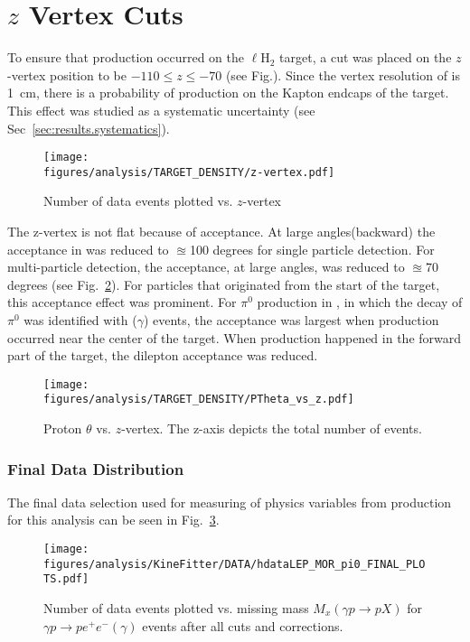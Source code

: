 \FloatBarrier
\section{$z$ Vertex Cuts}\label{sec:analysis.zvert}
To ensure that \piz production occurred on the $\ell$H$_2$ target, a cut was placed on the $z$-vertex position to be $-110 \le z \le -70$ (see Fig.). Since the vertex resolution of  is 1~cm, there is a probability of \piz production on the Kapton endcaps of the target. This effect was studied as a systematic uncertainty (see Sec~\ref{sec:results.systematics}). 
\begin{figure}[h!]\begin{center}
\texttt{[image: \\figures/analysis/TARGET\_DENSITY/z-vertex.pdf]}
\caption[Number of data events plotted vs. $z$-vertex]{\label{fig:zcut}Number of data events plotted vs. $z$-vertex}
\end{center}\end{figure}
The z-vertex is not flat because of acceptance. At large angles(backward) the acceptance in  was reduced to $\approxeq$100 degrees for single particle detection. For multi-particle detection, the acceptance, at large angles, was reduced to $\approxeq$70 degrees (see Fig.~\ref{fig:Ptheta_z}). For particles that originated from the start of the target, this acceptance effect was prominent. For $\pi^0$ production in , in which the decay of $\pi^0$ was identified with \epem($\gamma$) events, the acceptance was largest when production occurred near the center of the target. When production happened in the forward part of the target, the dilepton acceptance was reduced. 

\begin{figure}[h!]\begin{center}
\texttt{[image: \\figures/analysis/TARGET\_DENSITY/PTheta\_vs\_z.pdf]}
\caption[Proton $\theta$ vs. $z$-vertex]{\label{fig:Ptheta_z}Proton $\theta$ vs. $z$-vertex. The z-axis depicts the total number of events.}
\end{center}\end{figure}
\FloatBarrier
\subsubsection{Final Data Distribution}\label{sec.final.data}
The final data selection used for measuring of physics variables from \piz production for this analysis can be seen in Fig.~\ref{fig:kinfit.final.plot}.

\begin{figure}[h!]\begin{center}
\texttt{[image: \\figures/analysis/KineFitter/DATA/hdataLEP\_MOR\_pi0\_FINAL\_PLOTS.pdf]}
\caption[Number of data events plotted vs. missing mass $M_x(\gamma p \to p X)$ for $\gamma p \to p e^+ e^- (\gamma)$ events after all cuts and corrections.]{\label{fig:kinfit.final.plot}Number of data events plotted vs. missing mass $M_x(\gamma p \to p X)$ for $\gamma p \to p e^+ e^- (\gamma)$ events after all cuts and corrections.}
\end{center}\end{figure}
\FloatBarrier
